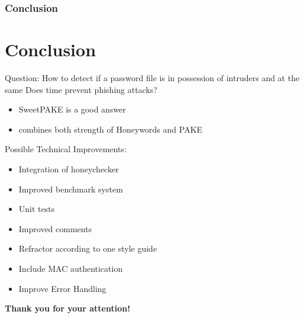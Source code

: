 \documentclass[9pt]{beamer}
\begin{document}
\begin{frame}[fragile]
\frametitle{Conclusion}
\section{Conclusion}
	Question: How to detect if a password file is in possession of
	intruders and at the same Does time prevent phishing attacks?
\begin{itemize}
	\item SweetPAKE is a good answer
	\item combines both strength of Honeywords and PAKE
\end{itemize}

Possible Technical Improvements:
\begin{itemize}
	\item Integration of honeychecker
	\item Improved benchmark system
	\item Unit tests
	\item Improved comments
	\item Refractor according to one style guide
	\item Include MAC authentication
	\item Improve Error Handling
\end{itemize}
\end{frame}

\begin{frame}[fragile]
\begin{center}
    \textbf{Thank you for your attention!}\\
\end{center}
\end{frame}
\end{document}
